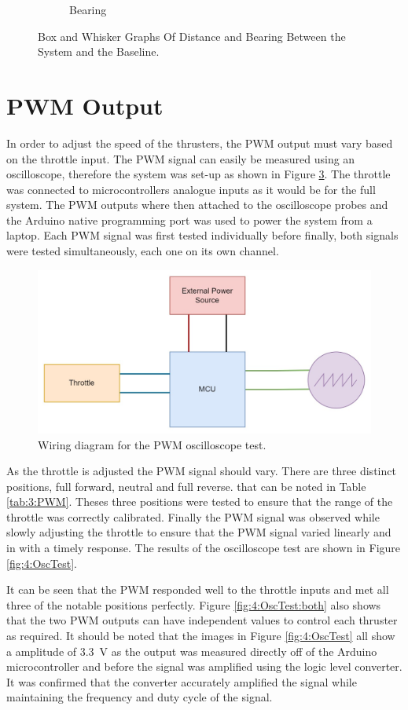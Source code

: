 \begin{figure}[!hb]
\begin{center}
\begin{subfigure}{0.475\linewidth}
 			\caption{Bearing}
 			\label{fig:4:bearingBxWh}	
 		\end{subfigure}
 	\caption{Box and Whisker Graphs Of Distance and Bearing Between the System and the Baseline.}
 	\end{center}
 \end{figure} 
\section{PWM Output}
In order to adjust the speed of the thrusters, the PWM output must vary based on the throttle input. The PWM signal can easily be measured using an oscilloscope, therefore the system was set-up as shown in Figure \ref{fig:4:PWMTest}. The throttle was connected to microcontrollers analogue inputs as it would be for the full system. The PWM outputs where then attached to the oscilloscope probes and the Arduino native programming port was used to power the system from a laptop. Each PWM signal was first tested individually before finally, both signals were tested simultaneously, each one on its own channel. \par
\begin{figure}
	\begin{center}
		\includegraphics[width=0.6\linewidth]{figures/PWMtest.jpg}
		\caption{Wiring diagram for the PWM oscilloscope test.}
		\label{fig:4:PWMTest}
	\end{center}
\end{figure}
As the throttle is adjusted the PWM signal should vary. There are three distinct positions, full forward, neutral and full reverse. that can be noted in Table \ref{tab:3:PWM}. Theses three positions were tested to ensure that the range of the throttle was correctly calibrated. Finally the PWM signal was observed while slowly adjusting the throttle to ensure that the PWM signal varied linearly and in with a timely response. The results of the oscilloscope test are shown in Figure \ref{fig:4:OscTest}. \par
It can be seen that the PWM responded well to the throttle inputs and met all three of the notable positions perfectly. Figure \ref{fig:4:OscTest:both} also shows that the two PWM outputs can have independent values to control each thruster as required. It should be noted that the images in Figure \ref{fig:4:OscTest} all show a amplitude of \SI{3.3}{\volt} as the output was measured directly off of the Arduino microcontroller and before the signal was amplified using the logic level converter. It was confirmed that the converter accurately amplified the signal while maintaining the frequency and duty cycle of the signal.
